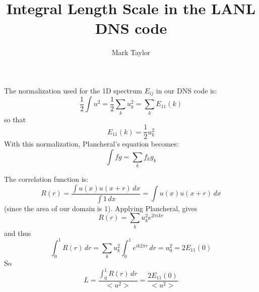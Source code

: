 \documentclass[12pt]{article}
\title{Integral Length Scale in the LANL DNS code}
\author{Mark Taylor}
\begin{document}
\maketitle

The normalization used for the 1D spectrum $E_{ij}$ in our DNS code
is:
\[
\frac12 \int u^2 = \frac12 \sum_k u_k^2  = \sum_k E_{11}(k)
\]
so that
\[
E_{11}(k) =  \frac12 u_k^2
\]
With this normalization, Plancheral's equation becomes:
\[
\int f g = \sum_k f_k g_k
\]

The correlation function is:
\[
R(r) = \frac{\int u(x) u(x+r) \,dx}{\int 1 \,dx   } = 
\int u(x) u(x+r) \,dx
\]
(since the area of our domain is 1).  Applying Plancheral,
gives
\[
R(r) =  \sum_k u_k^2  e^{2 \pi i k  r}
\]
and thus
\[
\int_0^1 R(r) \,dr = \sum_k u_k^2   \int_0^1 e^{i k 2 \pi r} \,dr
                   = u_0^2 = 2 E_{11}(0)
\]
So 
\[
L = \frac{\int_0^1 R(r) \,dr}{< u^2 > } = \frac{ 2 E_{11}(0) }{ < u^2 > }
\]
\end{document}
